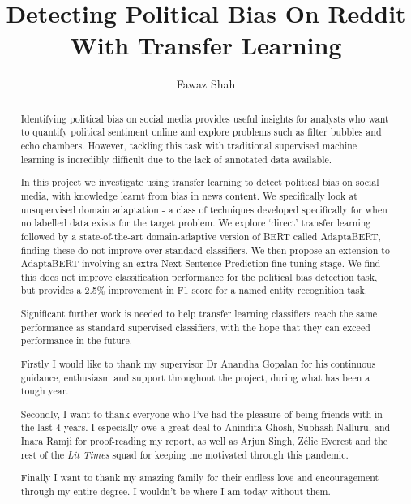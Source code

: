 \documentclass[a4paper, twoside]{report}
\title{Detecting Political Bias On Reddit With Transfer Learning}
\author{Fawaz Shah}
\begin{document}


\begin{abstract}

Identifying political bias on social media provides useful insights for analysts who want to quantify political sentiment online and explore problems such as filter bubbles and echo chambers. However, tackling this task with traditional supervised machine learning is incredibly difficult due to the lack of annotated data available.

In this project we investigate using transfer learning to detect political bias on social media, with knowledge learnt from bias in news content. We specifically look at unsupervised domain adaptation - a class of techniques developed specifically for when no labelled data exists for the target problem. We explore `direct' transfer learning followed by a state-of-the-art domain-adaptive version of BERT called AdaptaBERT, finding these do not improve over standard classifiers. We then propose an extension to AdaptaBERT involving an extra Next Sentence Prediction fine-tuning stage. We find this does not improve classification performance for the political bias detection task, but provides a 2.5\% improvement in F1 score for a named entity recognition task.

Significant further work is needed to help transfer learning classifiers reach the same performance as standard supervised classifiers, with the hope that they can exceed performance in the future.

\end{abstract}

\renewcommand{\abstractname}{Acknowledgements}
\begin{abstract}

Firstly I would like to thank my supervisor Dr Anandha Gopalan for his continuous guidance, enthusiasm and support throughout the project, during what has been a tough year.

Secondly, I want to thank everyone who I've had the pleasure of being friends with in the last 4 years. I especially owe a great deal to Anindita Ghosh, Subhash Nalluru, and Inara Ramji for proof-reading my report, as well as Arjun Singh, Zélie Everest and the rest of the \textit{Lit Times} squad for keeping me motivated through this pandemic.

Finally I want to thank my amazing family for their endless love and encouragement through my entire degree. I wouldn't be where I am today without them.

\end{abstract}

\tableofcontents
\listoffigures
\listoftables









\end{document}
